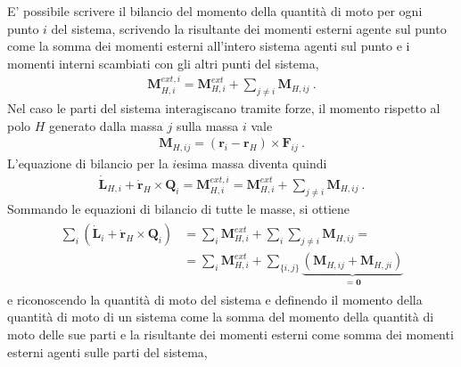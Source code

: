 \documentclass[letterpaper,10pt,english]{jupyterBook}
\begin{document}
\sphinxAtStartPar
{}
E’ possibile scrivere il bilancio del momento della quantità di moto per ogni punto \(i\) del sistema, scrivendo la risultante dei momenti esterni agente sul punto come la somma dei momenti esterni all’intero sistema agenti sul punto e i momenti interni scambiati con gli altri punti del sistema,
\begin{equation*}
\begin{split}\mathbf{M}_{H,i}^{ext,i} = \mathbf{M}_{H,i}^{ext} + \sum_{j \ne i} \mathbf{M}_{H,ij} \ .\end{split}
\end{equation*}
\sphinxAtStartPar
Nel caso le parti del sistema interagiscano tramite forze, il momento rispetto al polo \(H\) generato dalla massa \(j\) sulla massa \(i\) vale
\begin{equation*}
\begin{split}\mathbf{M}_{H,ij} = (\mathbf{r}_i - \mathbf{r}_H) \times \mathbf{F}_{ij} \ .\end{split}
\end{equation*}
\sphinxAtStartPar
L’equazione di bilancio per la \(i\)\sphinxhyphen{}esima massa diventa quindi
\begin{equation*}
\begin{split}\dot{\mathbf{L}}_{H,i} + \dot{\mathbf{r}}_H \times \mathbf{Q}_i = \mathbf{M}_{H,i}^{ext,i} = \mathbf{M}_{H,i}^{ext} + \sum_{j \ne i} \mathbf{M}_{H,ij} \ .\end{split}
\end{equation*}
\sphinxAtStartPar
Sommando le equazioni di bilancio di tutte le masse, si ottiene
\begin{equation*}
\begin{split}\begin{aligned}
\sum_{i} \left( \dot{\mathbf{L}}_i + \dot{\mathbf{r}}_H \times \mathbf{Q}_i \right) & = \sum_i \mathbf{M}_{H,i}^{ext} + \sum_i \sum_{j \ne i} \mathbf{M}_{H,ij} = \\
                            & = \sum_i \mathbf{M}_{H,i}^{ext} + \sum_{\{i,j\}} \underbrace{\left( \mathbf{M}_{H,ij} + \mathbf{M}_{H,ji} \right)}_{=\mathbf{0}} 
\end{aligned}\end{split}
\end{equation*}
\sphinxAtStartPar
e riconoscendo la quantità di moto del sistema e definendo il momento della quantità di moto di un sistema come la somma del momento della quantità di moto delle sue parti e la risultante dei momenti esterni come somma dei momenti esterni agenti sulle parti del sistema,
\end{document}
